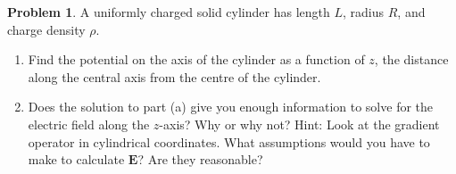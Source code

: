 \documentclass[10pt]{article}
\theoremstyle{definition}
\newtheorem{problem}{Problem}
\newcommand{\bv}[1]{\mathbf{#1}}
\begin{document}
\begin{problem}
A uniformly charged solid cylinder has length $L$, radius $R$, and charge density $\rho$.
\begin{enumerate}[label=(\alph*)]
  \item Find the potential on the axis of the cylinder as a function of $z$, the distance along the central axis from
        the centre of the cylinder.
  \item Does the solution to part (a) give you enough information to solve for the electric field along the $z$-axis?
        Why or why not? Hint: Look at the gradient operator in cylindrical coordinates. What assumptions would
        you have to make to calculate $\bv{E}$? Are they reasonable?
\end{enumerate}
\end{problem}
\end{document}
